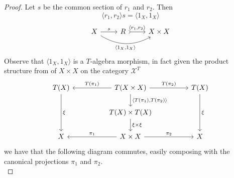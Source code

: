 \begin{subbox}{}
    \begin{proof}
        Let $s$ be the common section of $r_1$ and $r_2$. Then
        \[\langle r_1, r_2 \rangle s = \langle 1_X, 1_X \rangle \]
        \[
\begin{tikzcd}
X \arrow[r, "s"] \arrow[rr, "{\langle 1_X,1_X\rangle}"', bend right] & R \arrow[r, "{\langle r_1, r_2 \rangle}", tail] & X\times X
\end{tikzcd}
\]
Observe that ${\langle 1_X,1_X\rangle}$ is a $T$-algebra morphism, in fact given the product structure from  of $X\times X$ on the category $\mathcal{X}^T$
\[
\begin{tikzcd}
T(X) \arrow[dd, "\xi"] &  & T(X\times X) \arrow[d, "{\langle T(\pi_1), T(\pi_2)\rangle}"] \arrow[rr, "T(\pi_2)"] \arrow[ll, "T(\pi_1)"'] &  & T(X) \arrow[dd, "\xi"] \\
                       &  & T(X)\times T(X) \arrow[d, "\xi \times \xi"]                                                                  &  &                        \\
X                      &  & X\times X \arrow[rr, "\pi_2"] \arrow[ll, "\pi_1"']                                                           &  & X                     
\end{tikzcd}
\]
we have that the following diagram commutes, easily composing with the canonical projections $\pi_1$ and $\pi_2$.
\[
\]
\end{proof}
\end{subbox}
